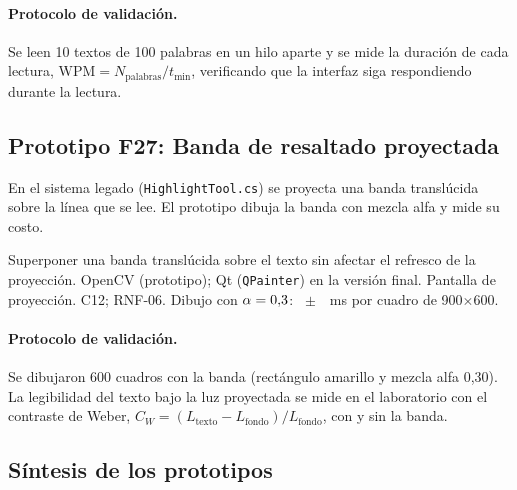 \paragraph{Protocolo de validación.} Se leen 10 textos de 100 palabras en un hilo aparte y se mide la duración de cada lectura, $\mathrm{WPM}=N_{\text{palabras}}/t_{\text{min}}$, verificando que la interfaz siga respondiendo durante la lectura.

\subsection{Prototipo F27: Banda de resaltado proyectada}

En el sistema legado (\texttt{HighlightTool.cs}) se proyecta una banda translúcida sobre la línea que se lee. El prototipo dibuja la banda con mezcla alfa y mide su costo.

{Superponer una banda translúcida sobre el texto sin afectar el refresco de la proyección.}
{OpenCV (prototipo); Qt (\texttt{QPainter}) en la versión final.}
{Pantalla de proyección.}
{C12; RNF-06.}
{ Dibujo con $\alpha=0{,}3$: \FVeintisieteTiempoMs~$\pm$~\FVeintisieteTiempoSdMs~ms por cuadro de 900$\times$600.\newline {}}

\paragraph{Protocolo de validación.} Se dibujaron 600 cuadros con la banda (rectángulo amarillo y mezcla alfa 0,30). La legibilidad del texto bajo la luz proyectada se mide en el laboratorio con el contraste de Weber, $C_W=(L_{\text{texto}}-L_{\text{fondo}})/L_{\text{fondo}}$, con y sin la banda.

\subsection{Síntesis de los prototipos}
\label{sec:sintesis_prototipos}

